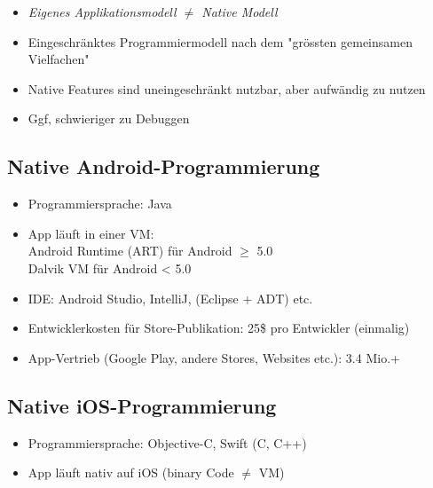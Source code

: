 \documentclass[a4paper]{article}
\begin{document}
{\begin{itemize}
		\item \textit{Eigenes Applikationsmodell $\neq$ Native Modell}
		
		\item Eingeschränktes Programmiermodell nach dem "grössten gemeinsamen Vielfachen"
		
		\item Native Features sind uneingeschränkt nutzbar, aber aufwändig zu nutzen
		
		\item Ggf, schwieriger zu Debuggen
		
	\end{itemize}
	
	\subsection{Native Android-Programmierung}
	
	\begin{itemize}
		
		\item Programmiersprache: Java
		
		\item App läuft in einer VM:\\
				\quad Android Runtime (ART) für Android $\geq$ 5.0\\
				\quad Dalvik VM für Android < 5.0
		
		\item IDE: Android Studio, IntelliJ, (Eclipse +  ADT) etc.
		
		\item Entwicklerkosten für Store-Publikation: 25\$ pro Entwickler (einmalig)
		
		\item App-Vertrieb (Google Play, andere Stores, Websites etc.): 3.4 Mio.+
		
	\end{itemize}

	\subsection{Native iOS-Programmierung}
	
	\begin{itemize}
		
		\item Programmiersprache: Objective-C, Swift (C, C++)
		
		\item App läuft nativ auf iOS (binary Code $\neq$ VM)
		

\end{itemize}}
\end{document}
